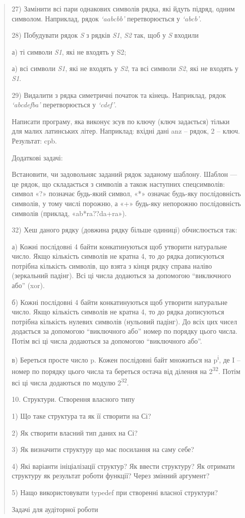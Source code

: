 \documentclass[]{article}
\begin{document}
\begin{quote}
27) Замінити всі пари однакових символів рядка, які йдуть підряд, одним
символом. Наприклад, рядок \emph{`aabcbb'} перетворюється у
\emph{`abcb'}.

28) Побудувати рядок \emph{S} з рядків \emph{S1}, \emph{S2} так, щоб у
\emph{S} входили

а) ті символи \emph{S1}, які не входять у S2;

а) всі символи \emph{S1}, які не входять у \emph{S2}, та всі символи
\emph{S2}, які не входять у \emph{S1}.

29) Видалити з рядка симетричні початок та кінець. Наприклад, рядок
\emph{`abcdefba'} перетворюється у \emph{`cdef'}.

Написати програму, яка виконує зсув по ключу (ключ задається) тільки для
малих латинських літер. Наприклад: вхідні дані anz -- рядок, 2 -- ключ.
Результат: cpb.

Додаткові задачі:

Встановити, чи задовольняє заданий рядок заданому шаблону. Шаблон --- це
рядок, що складається з символів а також наступних спецсимволів: символ
«?» позначає будь-який символ, «*» означає будь-яку послідовність
символів, у тому числі порожню, а «+» будь-яку непорожню послідовність
символів (приклад, «ab*ra??da+ra»).

32) Хеш даного рядку (довжина рядку більше одиниці) обчислюється так:

а) Кожні послідовні 4 байти конкатинуються щоб утворити натуральне
число. Якщо кількість символів не кратна 4, то до рядка дописуються
потрібна кількість символів, що взята з кінця рядку справа наліво
(зеркальний падінг). Всі ці числа додаються за допомогою ``виключного
або'' (xor).

б) Кожні послідовні 4 байти конкатинуються щоб утворити натуральне
число. Якщо кількість символів не кратна 4, то до рядка дописуються
потрібна кількість нулевих символів (нульовий падінг). До всіх цих чисел
додається за допомогою ``виключного або'' номер по порядку цього числа.
Потім всі ці числа додаються за допомогою ``виключного або''.

в) Береться просте число p. Кожен послідовні байт множиться на
p\textsuperscript{i}, де I -- номер по порядку цього числа та береться
остача від ділення на 2\textsuperscript{32}. Потім всі ці числа
додаються по модулю 2\textsuperscript{32}.

10. Структури. Створення власного типу

1) Що таке структура та як її створити на Сі?

2) Як створити власний тип даних на Сі?

3) Як визначити структуру що має посилання на саму себе?

4) Які варіанти ініціалізації структур? Як ввести структуру? Як отримати
структуру як результат роботи функції? Через змінний аргумент?

5) Нащо використовувати typedef при створенні власної структури?

Задачі для аудіторної роботи
\end{quote}
\end{document}

